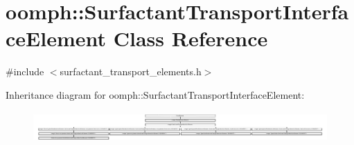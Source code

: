 \hypertarget{classoomph_1_1SurfactantTransportInterfaceElement}{}\section{oomph\+:\+:Surfactant\+Transport\+Interface\+Element Class Reference}
\label{classoomph_1_1SurfactantTransportInterfaceElement}


{\ttfamily \#include $<$surfactant\+\_\+transport\+\_\+elements.\+h$>$}

Inheritance diagram for oomph\+:\+:Surfactant\+Transport\+Interface\+Element\+:\begin{figure}[H]
\begin{center}
\leavevmode
\includegraphics[height=1.191489cm]{classoomph_1_1SurfactantTransportInterfaceElement}
\end{center}
\end{figure}
